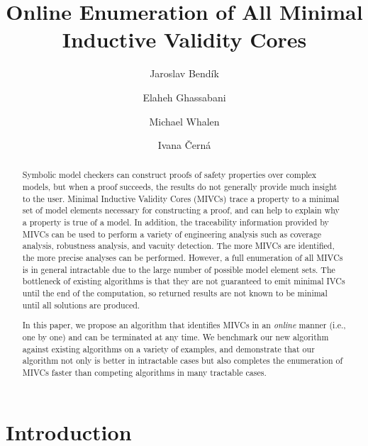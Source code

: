 \documentclass{llncs}
\begin{document}
\title{Online Enumeration of All Minimal Inductive Validity Cores}

\author{Jaroslav Bend\'ik
	\and Elaheh Ghassabani
	\and Michael Whalen
	\and Ivana \v Cern\'a
}



\maketitle
\begin{abstract}
Symbolic model checkers can construct proofs of safety properties over complex models, but when a proof succeeds, the results do not generally provide much insight to the user.  Minimal Inductive Validity Cores (MIVCs) trace a property to a minimal set of model elements necessary for constructing a proof, and can help to explain why a property is true of a model.  In addition, the traceability information provided by MIVCs can be used to perform a variety of engineering analysis such as coverage analysis, robustness analysis, and vacuity detection.  The more MIVCs are identified, the more precise analyses can be performed.   However, a full enumeration of all MIVCs is in general intractable due to the large number of possible model element sets.  The bottleneck of existing algorithms is that they are not guaranteed to emit minimal IVCs until the end of the computation, so returned results are not known to be minimal until all solutions are produced.

In this paper, we propose an algorithm that identifies MIVCs in an \emph{online} manner (i.e., one by one) and can be terminated at any time.  We benchmark our new algorithm against existing algorithms on a variety of examples, and demonstrate that our algorithm not only is better in intractable cases but also completes the enumeration of MIVCs faster than competing algorithms in many tractable cases.

\end{abstract}



\section{Introduction}
\label{sec:intro}

\end{document}
